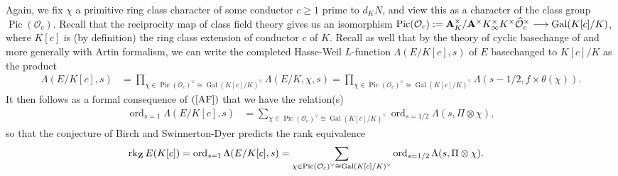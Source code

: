 \documentclass{amsart}
\theoremstyle{definition}
\begin{document}
Again, we fix $\chi$ a primitive ring class character of some conductor $c \geq 1$ prime to $d_K N$, 
and view this as a character of the class group $\operatorname{Pic}(\mathcal{O}_c)$. 
Recall that the reciprocity map of class field theory gives us an isomorphism 
$\operatorname{Pic}(\mathcal{O}_c) := {\bf{A}}_K^{\times} /{\bf{A}}^{\times}  K_{\infty}^{\times} K^{\times} \widehat{\mathcal{O}}_c^{\times}
\longrightarrow \operatorname{Gal}(K[c]/K)$,
where $K[c]$ is (by definition) the ring class extension of conductor $c$ of $K$. Recall as well
that by the theory of cyclic basechange of \cite{La} and more generally \cite{AC} with Artin formalism,
we can write the completed Hasse-Weil $L$-function $\Lambda(E/K[c], s)$ of $E$ basechanged to $K[c]/K$ as the product 
\begin{equation}\begin{aligned}\label{AF}
\Lambda(E/K[c] , s) &= \prod\limits_{\chi \in \operatorname{Pic}(\mathcal{O}_c)^{\vee} \cong \operatorname{Gal}(K[c]/K)^{\vee}} \Lambda(E/K, \chi, s) 
= \prod\limits_{\chi \in \operatorname{Pic}(\mathcal{O}_c)^{\vee} \cong \operatorname{Gal}(K[c]/K)^{\vee}} \Lambda(s-1/2, f \times \theta(\chi)). \end{aligned}\end{equation}
It then follows as a formal consequence of $(\ref{AF})$ that we have the relation(s) 
\begin{equation}\begin{aligned}\label{AF2}
\operatorname{ord}_{s=1} \Lambda(E/ K[c], s) 
&= \sum\limits_{\chi \in  \operatorname{Pic}(\mathcal{O}_c)^{\vee} \cong \operatorname{Gal}(K[c]/K)^{\vee}} 
\operatorname{ord}_{s=1/2} \Lambda (s, \Pi \otimes \chi), \end{aligned}\end{equation}
so that the conjecture of Birch and Swinnerton-Dyer predicts the rank equivalence 
\begin{equation}\begin{aligned}\label{AF3} \operatorname{rk}_{\bf{Z}} E(K[c]) = \operatorname{ord}_{s=1} \Lambda(E/ K[c], s) 
&= \sum\limits_{\chi \in  \operatorname{Pic}(\mathcal{O}_c)^{\vee} \cong \operatorname{Gal}(K[c]/K)^{\vee}} 
\operatorname{ord}_{s=1/2} \Lambda(s, \Pi \otimes \chi). \end{aligned}\end{equation}
\end{document}

